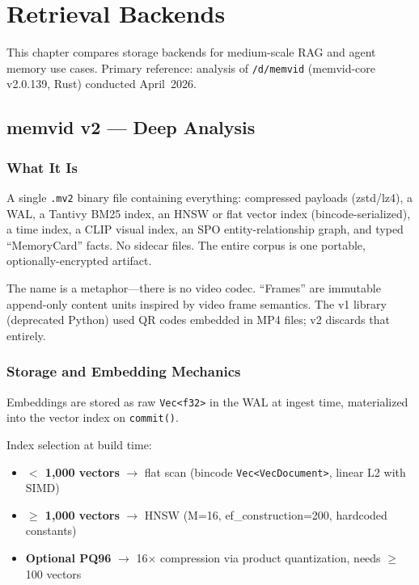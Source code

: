 \chapter{Retrieval Backends}
\label{ch:backends}

This chapter compares storage backends for medium-scale RAG and agent memory use cases.
Primary reference: analysis of \texttt{\texttildelow/d/memvid} (memvid-core v2.0.139, Rust)
conducted April~2026.

\section{memvid v2 --- Deep Analysis}

\subsection{What It Is}

A single \texttt{.mv2} binary file containing everything: compressed payloads (zstd/lz4),
a WAL, a Tantivy BM25 index, an HNSW or flat vector index (bincode-serialized), a time index,
a CLIP visual index, an SPO entity-relationship graph, and typed ``MemoryCard'' facts.
No sidecar files. The entire corpus is one portable, optionally-encrypted artifact.

The name is a metaphor---there is no video codec. ``Frames'' are immutable append-only content
units inspired by video frame semantics. The v1 library (deprecated Python) used QR codes
embedded in MP4 files; v2 discards that entirely.

\subsection{Storage and Embedding Mechanics}

Embeddings are stored as raw \texttt{Vec<f32>} in the WAL at ingest time, materialized into
the vector index on \texttt{commit()}.

Index selection at build time:

\begin{itemize}
    \item \textbf{$<$ 1{,}000 vectors} $\to$ flat scan (bincode \texttt{Vec<VecDocument>}, linear L2 with SIMD)
    \item \textbf{$\geq$ 1{,}000 vectors} $\to$ HNSW (M=16, ef\_construction=200, hardcoded constants)
    \item \textbf{Optional PQ96} $\to$ 16$\times$ compression via product quantization, needs $\geq$ 100 vectors
\end{itemize}

